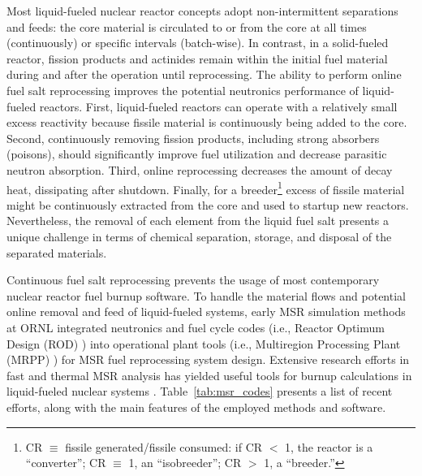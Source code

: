 Most liquid-fueled nuclear reactor concepts adopt non-intermittent separations 
and feeds: the core material is circulated to or from the core at all times 
(continuously) or specific intervals (batch-wise). In contrast, in a 
solid-fueled reactor, fission products and actinides remain within the initial 
fuel material during and after the operation until reprocessing. The ability 
to perform online fuel salt reprocessing improves the potential neutronics 
performance of liquid-fueled reactors. First, liquid-fueled reactors can 
operate with a relatively small excess reactivity because fissile material is 
continuously being added to the core. Second, continuously removing fission 
products, including strong absorbers (poisons), should significantly improve 
fuel utilization and decrease parasitic neutron absorption. Third, online 
reprocessing decreases the amount of decay heat, dissipating after shutdown.
Finally, for a breeder\footnote{\gls{CR} 
	$\equiv$ fissile generated/fissile consumed: if CR $<$ 1, the reactor is a 
	``converter''; CR $\equiv$ 1, an ``isobreeder''; CR $>$ 1, a 
	``breeder.''} excess of fissile material might be continuously extracted  
from the core and used to startup new reactors. Nevertheless, the removal of 
each element from the liquid fuel salt presents a unique challenge in terms of 
chemical separation, storage, and disposal of the separated materials.

Continuous fuel salt reprocessing prevents the usage of most contemporary 
nuclear reactor fuel burnup software. To handle the material flows and 
potential online removal and feed of liquid-fueled systems, early \gls{MSR} 
simulation methods at \gls{ORNL} integrated neutronics and fuel cycle 
codes (i.e., Reactor Optimum Design (ROD) \cite{bauman_rod_1971}) into 
operational plant tools (i.e., Multiregion Processing Plant (MRPP) 
\cite{kee_mrpp_1976}) for \gls{MSR} fuel reprocessing system design. Extensive 
research efforts in fast and thermal MSR analysis has yielded useful tools 
for burnup calculations in liquid-fueled nuclear systems  
\cite{fiorina_investigation_2013, sheu_depletion_2013, aufiero_extended_2013,
heuer_towards_2014, park_whole_2015, betzler_molten_2017, 
betzler_molten_2019}. Table~\ref{tab:msr_codes} presents a list of recent 
efforts, along with the main features of the employed methods and software.
\FloatBarrier

